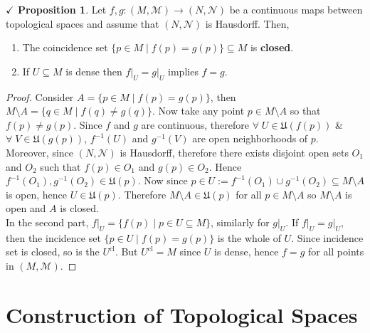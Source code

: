 \documentclass{article}
\theoremstyle{definition}
\theoremstyle{remark}
\theoremstyle{definition}
\theoremstyle{definition}
\newtheorem{proposition}{$\checkmark$ Proposition}
\newcommand{\topo}[1]{\mathcal{#1}}
\newcommand{\nbdsys}[2]{\mathfrak{#1}(#2)}
\newcommand{\closure}[1]{#1^{\text{cl}}}
\newcommand{\union}[0]{\cup}
\begin{document}
\hrulefill
\begin{proposition}
	Let $ f,g : (M,\topo{M}) \longrightarrow (N,\topo{N})$ be a continuous maps between topological spaces and assume that $ (N,\topo{N}) $ is Hausdorff. Then,
	\begin{enumerate}
		\item{The coincidence set $ \{p\in M\;\vert\; f(p) = g(p)\}\subseteq M $ is \textbf{closed}.}
		\item{If $ U\subseteq M $ is dense then $ \left.f\right \vert_U =  \left.g\right \vert_U $ implies $ f=g $.}
	\end{enumerate}
\end{proposition}
\begin{proof}
	Consider $ A = \{p\in M\;\vert\; f(p) = g(p)\} $, then $ M\setminus A = \{q\in M \;\vert\; f(q) \neq g(q)\}$. Now take any point $ p \in M\setminus A $ so that $ f(p) \neq g(p) $. Since $ f $ and $ g $ are continuous, therefore $ \forall \;U\in \nbdsys{U}{f(p)} $ \& $ \forall \;V\in \nbdsys{U}{g(p)} $, $ f^{-1}(U) $ and $ g^{-1}(V) $ are open neighborhoods of $ p $. Moreover, since $ (N,\topo{N}) $ is Hausdorff, therefore there exists disjoint open sets $ O_1 $ and $ O_2 $ such that $ f(p)\in O_1 $ and $ g(p)\in O_2 $. Hence $ f^{-1}(O_1),g^{-1}(O_2)\in \nbdsys{U}{p} $. Now since $ p\in U := f^{-1}(O_1) \union g^{-1}(O_2) \subseteq M\setminus A$ is open, hence $ U\in \nbdsys{U}{p} $. Therefore $ M\setminus A \in \nbdsys{U}{p}$ for all $ p\in M\setminus A$ so $ M\setminus A $ is open and $ A $ is closed.\\
	In the second part, $ \left . f\right \vert_U = \{f(p)\;\vert\;p\in U\subseteq M\}$, similarly for $ \left .g\right \vert_U $. If $ \left .f\right \vert_U = \left .g\right \vert_U $, then the incidence set $ \{p\in U\;\vert\; f(p) = g(p)\} $ is the whole of $ U $. Since incidence set is closed, so is the $ \closure{U} $. But $ \closure{U} = M $ since $ U $ is dense, hence $ f = g $ for all points in $ (M,\topo{M}) $.
\end{proof}
\hrulefill
\newpage
\section{Construction of Topological Spaces}
\end{document}

